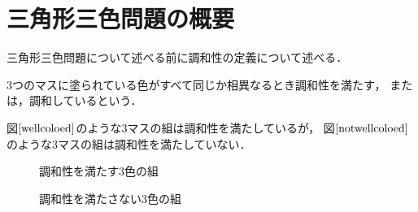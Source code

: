 \section{三角形三色問題の概要}
三角形三色問題について述べる前に調和性の定義について述べる．
\begin{dfn}[調和性] \label{dfn:wc}
  $3$つのマスに塗られている色がすべて同じか相異なるとき調和性を満たす，
  または，調和しているという．
\end{dfn}
\begin{exm}
  図$\ref{wellcoloed}$のような$3$マスの組は調和性を満たしているが，
  図$\ref{notwellcoloed}$のような$3$マスの組は調和性を満たしていない．
  \begin{figure}[h]
    \centering
    
    \caption{調和性を満たす$3$色の組}
    \label{wellcoloed}
  \end{figure}
  \begin{figure}[h]
    \centering
    
    \caption{調和性を満たさない$3$色の組}
    \label{notwellcoloed}
  \end{figure}
\end{exm}

